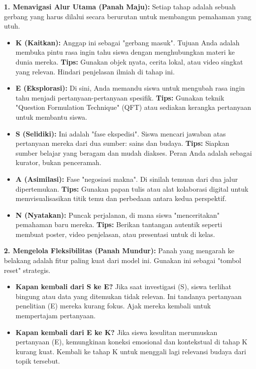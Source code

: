 \documentclass[12pt,a4paper,oneside]{book}
\begin{document}
\textbf{1. Menavigasi Alur Utama (Panah Maju):}
Setiap tahap adalah sebuah gerbang yang harus dilalui secara berurutan untuk membangun pemahaman yang utuh.
\begin{itemize}
    \item \textbf{K (Kaitkan):} Anggap ini sebagai "gerbang masuk". Tujuan Anda adalah membuka pintu rasa ingin tahu siswa dengan menghubungkan materi ke dunia mereka. \textbf{Tips:} Gunakan objek nyata, cerita lokal, atau video singkat yang relevan. Hindari penjelasan ilmiah di tahap ini.
    \item \textbf{E (Eksplorasi):} Di sini, Anda memandu siswa untuk mengubah rasa ingin tahu menjadi pertanyaan-pertanyaan spesifik. \textbf{Tips:} Gunakan teknik "Question Formulation Technique" (QFT) atau sediakan kerangka pertanyaan untuk membantu siswa.
    \item \textbf{S (Selidiki):} Ini adalah "fase ekspedisi". Siswa mencari jawaban atas pertanyaan mereka dari dua sumber: sains dan budaya. \textbf{Tips:} Siapkan sumber belajar yang beragam dan mudah diakses. Peran Anda adalah sebagai kurator, bukan penceramah.
    \item \textbf{A (Asimilasi):} Fase "negosiasi makna". Di sinilah temuan dari dua jalur dipertemukan. \textbf{Tips:} Gunakan papan tulis atau alat kolaborasi digital untuk memvisualisasikan titik temu dan perbedaan antara kedua perspektif.
    \item \textbf{N (Nyatakan):} Puncak perjalanan, di mana siswa "menceritakan" pemahaman baru mereka. \textbf{Tips:} Berikan tantangan autentik seperti membuat poster, video penjelasan, atau presentasi untuk di kelas.
\end{itemize}
\textbf{2. Mengelola Fleksibilitas (Panah Mundur):}
Panah yang mengarah ke belakang adalah fitur paling kuat dari model ini. Gunakan ini sebagai "tombol reset" strategis.
\begin{itemize}
    \item \textbf{Kapan kembali dari S ke E?} Jika saat investigasi (S), siswa terlihat bingung atau data yang ditemukan tidak relevan. Ini tandanya pertanyaan penelitian (E) mereka kurang fokus. Ajak mereka kembali untuk mempertajam pertanyaan.
    \item \textbf{Kapan kembali dari E ke K?} Jika siswa kesulitan merumuskan pertanyaan (E), kemungkinan koneksi emosional dan kontekstual di tahap K kurang kuat. Kembali ke tahap K untuk menggali lagi relevansi budaya dari topik tersebut.
\end{itemize}
\end{document}
